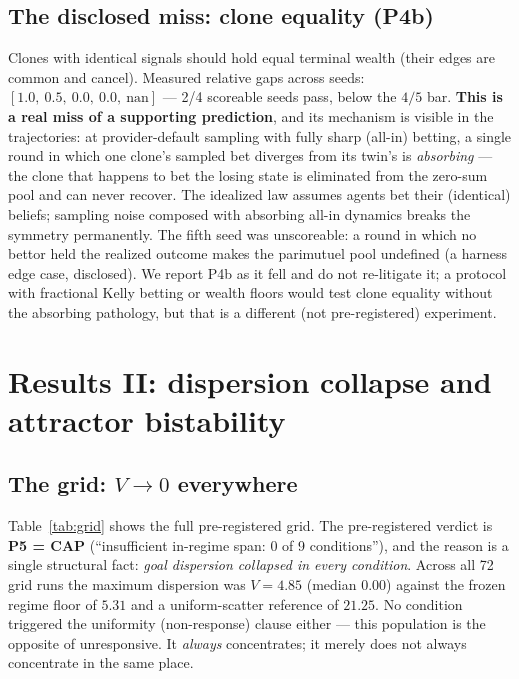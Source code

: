 \documentclass{article} %
\begin{document}
\subsection{The disclosed miss: clone equality (P4b)}
\label{sec:p4b}

Clones with identical signals should hold equal terminal wealth (their edges are common and cancel). Measured relative gaps across seeds: $[1.0,\ 0.5,\ 0.0,\ 0.0,\ \mathrm{nan}]$ --- 2/4 scoreable seeds pass, below the $4/5$ bar. \textbf{This is a real miss of a supporting prediction}, and its mechanism is visible in the trajectories: at provider-default sampling with fully sharp (all-in) betting, a single round in which one clone's sampled bet diverges from its twin's is \emph{absorbing} --- the clone that happens to bet the losing state is eliminated from the zero-sum pool and can never recover. The idealized law assumes agents bet their (identical) beliefs; sampling noise composed with absorbing all-in dynamics breaks the symmetry permanently. The fifth seed was unscoreable: a round in which no bettor held the realized outcome makes the parimutuel pool undefined (a harness edge case, disclosed). We report P4b as it fell and do not re-litigate it; a protocol with fractional Kelly betting or wealth floors would test clone equality without the absorbing pathology, but that is a different (not pre-registered) experiment.

\section{Results II: dispersion collapse and attractor bistability}
\label{sec:results-ii}

\subsection{The grid: $V \to 0$ everywhere}

Table~\ref{tab:grid} shows the full pre-registered grid. The pre-registered verdict is \textbf{P5 = CAP} (``insufficient in-regime span: 0 of 9 conditions''), and the reason is a single structural fact: \emph{goal dispersion collapsed in every condition}. Across all 72 grid runs the maximum dispersion was $V = 4.85$ (median $0.00$) against the frozen regime floor of $5.31$ and a uniform-scatter reference of $21.25$. No condition triggered the uniformity (non-response) clause either --- this population is the opposite of unresponsive. It \emph{always} concentrates; it merely does not always concentrate in the same place.
\end{document}
